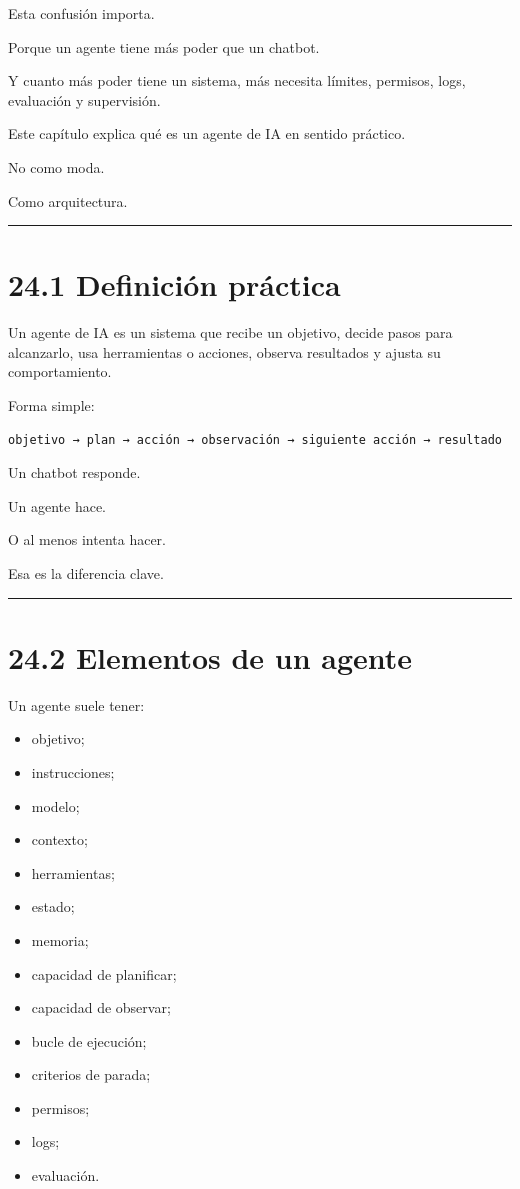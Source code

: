 Esta confusión importa.

Porque un agente tiene más poder que un chatbot.

Y cuanto más poder tiene un sistema, más necesita límites, permisos,
logs, evaluación y supervisión.

Este capítulo explica qué es un agente de IA en sentido práctico.

No como moda.

Como arquitectura.

\begin{center}\rule{0.5\linewidth}{0.5pt}\end{center}

\section{24.1 Definición práctica}\label{definiciuxf3n-pruxe1ctica}

Un agente de IA es un sistema que recibe un objetivo, decide pasos para
alcanzarlo, usa herramientas o acciones, observa resultados y ajusta su
comportamiento.

Forma simple:

\begin{lstlisting}
objetivo → plan → acción → observación → siguiente acción → resultado
\end{lstlisting}

Un chatbot responde.

Un agente hace.

O al menos intenta hacer.

Esa es la diferencia clave.

\begin{center}\rule{0.5\linewidth}{0.5pt}\end{center}

\section{24.2 Elementos de un agente}\label{elementos-de-un-agente}

Un agente suele tener:

\begin{itemize}
\tightlist
\item
  objetivo;
\item
  instrucciones;
\item
  modelo;
\item
  contexto;
\item
  herramientas;
\item
  estado;
\item
  memoria;
\item
  capacidad de planificar;
\item
  capacidad de observar;
\item
  bucle de ejecución;
\item
  criterios de parada;
\item
  permisos;
\item
  logs;
\item
  evaluación.
\end{itemize}

